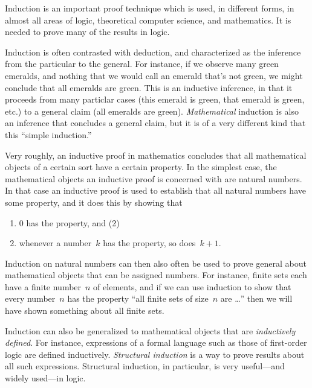 \documentclass[../../../include/open-logic-section]{subfiles}
\begin{document}


Induction is an important proof technique which is used, in different
forms, in almost all areas of logic, theoretical computer science, and
mathematics.  It is needed to prove many of the results in logic.

Induction is often contrasted with deduction, and characterized as the
inference from the particular to the general.  For instance, if we
observe many green emeralds, and nothing that we would call an emerald
that's not green, we might conclude that all emeralds are green. This
is an inductive inference, in that it proceeds from many particlar
cases (this emerald is green, that emerald is green, etc.) to a
general claim (all emeralds are green).  \emph{Mathematical} induction
is also an inference that concludes a general claim, but it is of a
very different kind that this ``simple induction.''

Very roughly, an inductive proof in mathematics concludes that all
mathematical objects of a certain sort have a certain property.  In
the simplest case, the mathematical objects an inductive proof is
concerned with are natural numbers.  In that case an inductive proof
is used to establish that all natural numbers have some property, and
it does this by showing that
\begin{enumerate}
    \item $0$ has the property, and (2)
    \item whenever a number~$k$ has the property, so does~$k+1$.
\end{enumerate}
Induction on natural numbers can then also often be used to prove
general about mathematical objects that can be assigned numbers. For
instance, finite sets each have a finite number~$n$ of elements, and
if we can use induction to show that every number~$n$ has the property
``all finite sets of size~$n$ are \dots'' then we will have shown
something about all finite sets.

Induction can also be generalized to mathematical objects that are
\emph{inductively defined}.  For instance, expressions of a formal
language such as those of first-order logic are defined inductively.
\emph{Structural induction} is a way to prove results about all such
expressions.  Structural induction, in particular, is very
useful---and widely used---in logic.
\end{document}
